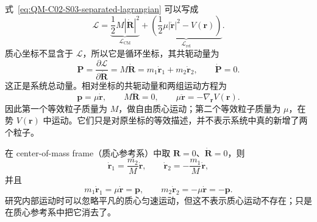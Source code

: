 
式~\eqref{eq:QM-C02-S03-separated-lagrangian} 可以写成
\begin{equation}
  \mathcal L
  =\underbrace{\frac12M|\dot{\bm R}|^2}_{\mathcal L_{\mathrm{CM}}}
  +\underbrace{\left(\frac12\mu|\dot{\bm r}|^2-V(\bm r)\right)}_{\mathcal L_{\mathrm{rel}}}.
  \label{eq:QM-C02-S03-lagrangian-parts}
\end{equation}
质心坐标不显含于 $\mathcal L$，所以它是循环坐标，其共轭动量为
\begin{equation}
  \boxed{
  \bm P=\frac{\partial\mathcal L}{\partial\dot{\bm R}}
  =M\dot{\bm R}
  =m_1\dot{\bm r}_1+m_2\dot{\bm r}_2,}
  \qquad
  \dot{\bm P}=0.
  \label{eq:QM-C02-S03-total-momentum}
\end{equation}
这正是系统总动量。相对坐标的共轭动量和两组运动方程为
\begin{equation}
  \boxed{
  \bm p=\mu\dot{\bm r},
  \qquad
  M\ddot{\bm R}=0,
  \qquad
  \mu\ddot{\bm r}=-\nabla_{\bm r}V(\bm r).}
  \label{eq:QM-C02-S03-equations-of-motion}
\end{equation}
因此第一个等效粒子质量为 $M$，做自由质心运动；第二个等效粒子质量为 $\mu$，在势 $V(\bm r)$ 中运动。它们只是对原坐标的等效描述，并不表示系统中真的新增了两个粒子。

在 center-of-mass frame（质心参考系）中取 $\bm R=0$、$\dot{\bm R}=0$，则
\begin{equation}
  \dot{\bm r}_1=\frac{m_2}{M}\dot{\bm r},
  \qquad
  \dot{\bm r}_2=-\frac{m_1}{M}\dot{\bm r},
  \label{eq:QM-C02-S03-cm-velocities}
\end{equation}
并且
\begin{equation}
  m_1\dot{\bm r}_1=\mu\dot{\bm r}=\bm p,
  \qquad
  m_2\dot{\bm r}_2=-\mu\dot{\bm r}=-\bm p.
  \label{eq:QM-C02-S03-cm-momenta}
\end{equation}
研究内部运动时可以忽略平凡的质心匀速运动，但这不表示质心运动不存在；只是在质心参考系中把它消去了。


